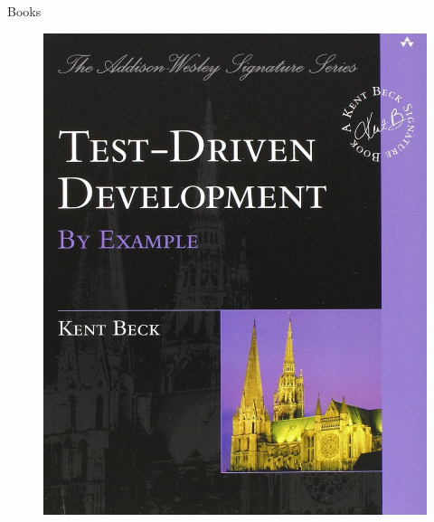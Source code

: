 \documentclass[14pt]{beamer}
\begin{document}

\begin{frame}[plain]{Books}
    \begin{figure}
        \center
        \includegraphics[height=.7\textheight]{TDD-by-Example}
        \label{fig:TDD-by-Example}
    \end{figure}
\end{frame}
\end{document}
